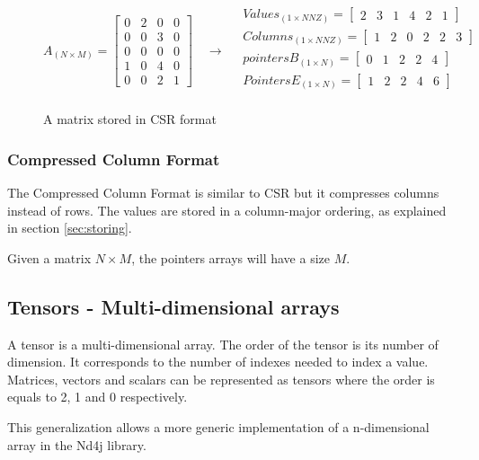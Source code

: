 \begin{figure}
	\[
	A_{(N\times M)} = 
	\begin{bmatrix}
	0 & 2 & 0 & 0\\
	0 & 0 & 3 & 0\\
	0 & 0 & 0 & 0\\
	1 & 0 & 4 & 0\\
	0 & 0 & 2 & 1
	\end{bmatrix}
	\quad\rightarrow\quad
	\begin{aligned}
	Values_{(1\times NNZ)} = 
	\begin{bmatrix}
	2 &  3 & 1 & 4 & 2 & 1
	\end{bmatrix}
	\\
	Columns_{(1\times NNZ)} = 
	\begin{bmatrix}
	1 &  2 & 0 & 2 & 2 & 3
	\end{bmatrix}
	\\
	pointersB_{(1\times N)} = 
	\begin{bmatrix}
	0 & 1 & 2 & 2 & 4 
	\end{bmatrix}
	\\
	PointersE_{(1\times N)} = 
	\begin{bmatrix}
	1 & 2 & 2 & 4 & 6
	\end{bmatrix}
	\\
	\end{aligned}
	\]
	\caption{A matrix stored in CSR format}
		\label{fig:csrformat}
\end{figure}
\subsubsection{Compressed Column Format}
The Compressed Column Format is similar to {CSR} but it compresses columns instead of rows. The values are stored in a column-major ordering, as explained in section \ref{sec:storing}.

Given a matrix $N\times M$, the pointers arrays will have a size $M$. 
\subsection{Tensors - Multi-dimensional arrays}

A tensor is a multi-dimensional array. The order of the tensor is its number of dimension. It corresponds to the number of indexes needed to index a value. Matrices, vectors and scalars can be represented as tensors where the order is equals to 2, 1 and 0 respectively.

This generalization allows a more generic implementation of a n-dimensional array in the Nd4j library.
